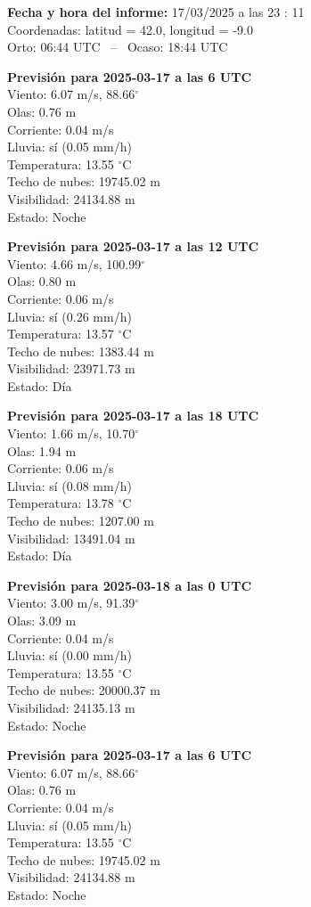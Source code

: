 {\bf Fecha y hora del informe:} 17/03/2025 a las 23 : 11\\
Coordenadas: latitud = 42.0, longitud = -9.0\\
Orto: 06:44 UTC \, -- \, Ocaso: 18:44 UTC

{\bf Previsión para 2025-03-17 a las 6 UTC}\\
  Viento: 6.07 m/s, 88.66$^\circ$\\
  Olas: 0.76 m\\
  Corriente: 0.04 m/s\\
  Lluvia: sí (0.05 mm/h)\\
  Temperatura: 13.55 $^\circ$C\\
  Techo de nubes: 19745.02 m\\
  Visibilidad: 24134.88 m\\
  Estado: Noche

{\bf Previsión para 2025-03-17 a las 12 UTC}\\
  Viento: 4.66 m/s, 100.99$^\circ$\\
  Olas: 0.80 m\\
  Corriente: 0.06 m/s\\
  Lluvia: sí (0.26 mm/h)\\
  Temperatura: 13.57 $^\circ$C\\
  Techo de nubes: 1383.44 m\\
  Visibilidad: 23971.73 m\\
  Estado: Día

{\bf Previsión para 2025-03-17 a las 18 UTC}\\
  Viento: 1.66 m/s, 10.70$^\circ$\\
  Olas: 1.94 m\\
  Corriente: 0.06 m/s\\
  Lluvia: sí (0.08 mm/h)\\
  Temperatura: 13.78 $^\circ$C\\
  Techo de nubes: 1207.00 m\\
  Visibilidad: 13491.04 m\\
  Estado: Día

{\bf Previsión para 2025-03-18 a las 0 UTC}\\
  Viento: 3.00 m/s, 91.39$^\circ$\\
  Olas: 3.09 m\\
  Corriente: 0.04 m/s\\
  Lluvia: sí (0.00 mm/h)\\
  Temperatura: 13.55 $^\circ$C\\
  Techo de nubes: 20000.37 m\\
  Visibilidad: 24135.13 m\\
  Estado: Noche

{\bf Previsión para 2025-03-17 a las 6 UTC}\\
  Viento: 6.07 m/s, 88.66$^\circ$\\
  Olas: 0.76 m\\
  Corriente: 0.04 m/s\\
  Lluvia: sí (0.05 mm/h)\\
  Temperatura: 13.55 $^\circ$C\\
  Techo de nubes: 19745.02 m\\
  Visibilidad: 24134.88 m\\
  Estado: Noche

